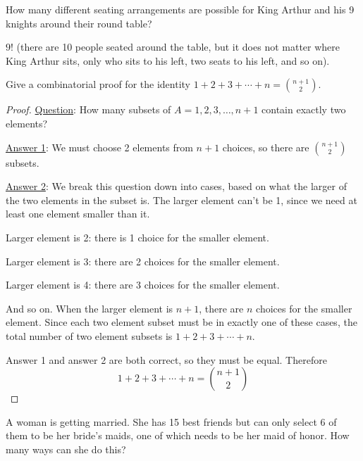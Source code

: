 \begin{questions}
\question How many different seating arrangements are possible for King Arthur and his 9 knights around their round table?

  \begin{answer}
     $9!$ (there are 10 people seated around the table, but it does not matter where King Arthur sits, only who sits to his left, two seats to his left, and so on).
  \end{answer}



  
\question Give a combinatorial proof for the identity $1 + 2 + 3 + \cdots + n = {n+1 \choose 2}$. 
	
	\begin{answer}
	\begin{proof}
        \underline{Question}: How many subsets of $A = {1,2,3, \ldots, n+1}$ contain exactly two elements?
        
        \underline{Answer 1}: We must choose 2 elements from $n+1$ choices, so there are ${n+1 \choose 2}$ subsets.
        
        \underline{Answer 2}: We break this question down into cases, based on what the larger of the two elements in the subset is. The larger element can't be 1, since we need at least one element smaller than it.
        
        Larger element is 2: there is 1 choice for the smaller element.
        
        Larger element is 3: there are 2 choices for the smaller element.
        
        Larger element is 4: there are 3 choices for the smaller element.
        
        And so on.  When the larger element is $n+1$, there are $n$ choices for the smaller element.  Since each two element subset must be in exactly one of these cases, the total number of two element subsets is $1 + 2 + 3 + \cdots + n$.
        
        Answer 1 and answer 2 are both correct, so they must be equal.  Therefore
        \[1 + 2 + 3 + \cdots + n = {n+1 \choose 2}\]
       \end{proof}
	\end{answer}
	
	
	
\question A woman is getting married.  She has 15 best friends but can only select 6 of them to be her bride's maids, one of which needs to be her maid of honor.  How many ways can she do this?
\begin{parts}

\end{parts}
\end{questions}
